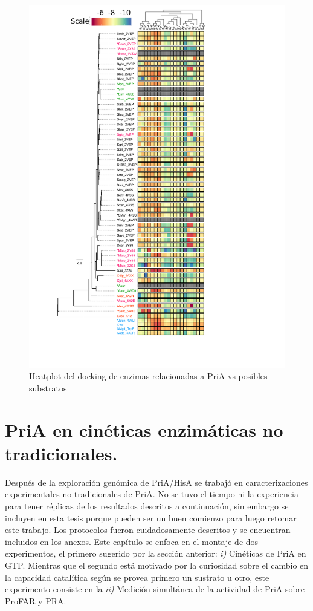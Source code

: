 \documentclass[12pt,twoside]{reedthesis}
\begin{document}
  \begin{figure}[h!tbp]
  \centering
  \includegraphics[angle = 0,scale = .7]{chapter4/Figura1_4.pdf}
  \caption[Heatplot del docking de enzimas relacionadas a PriA vs posibles substratos]{\footnotesize{Heatplot del docking de enzimas relacionadas a PriA vs posibles substratos}}
  \label{fig:HeatplodPriAdocking}
  \end{figure}
  
  \clearpage
  
  \section{PriA en cinéticas enzimáticas no
  tradicionales.}\label{pria-en-cineticas-enzimaticas-no-tradicionales.}
  
  Después de la exploración genómica de PriA/HisA se trabajó en
  caracterizaciones experimentales no tradicionales de PriA. No se tuvo el
  tiempo ni la experiencia para tener réplicas de los resultados descritos
  a continuación, sin embargo se incluyen en esta tesis porque pueden ser
  un buen comienzo para luego retomar este trabajo. Los protocolos fueron
  cuidadosamente descritos y se encuentran incluidos en los anexos. Este
  capítulo se enfoca en el montaje de dos experimentos, el primero
  sugerido por la sección anterior: \emph{i)} Cinéticas de PriA en GTP.
  Mientras que el segundo está motivado por la curiosidad sobre el cambio
  en la capacidad catalítica según se provea primero un sustrato u otro,
  este experimento consiste en la \emph{ii)} Medición simultánea de la
  actividad de PriA sobre ProFAR y PRA.
  
\end{document}
